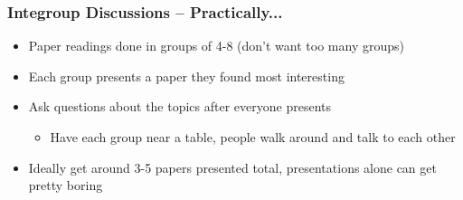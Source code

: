 \documentclass{beamer}
\begin{document}
\begin{frame}
  \frametitle{Integroup Discussions -- Practically...}
  \begin{itemize}
  \item Paper readings done in groups of 4-8 (don't want too many groups)
  \item Each group presents a paper they found most interesting
  \item Ask questions about the topics after everyone presents
    \begin{itemize}
    \item Have each group near a table, people walk around and talk to each other
    \end{itemize}
  \item Ideally get around 3-5 papers presented total, presentations alone can get pretty boring
  \end{itemize}
\end{frame}


\end{document}
